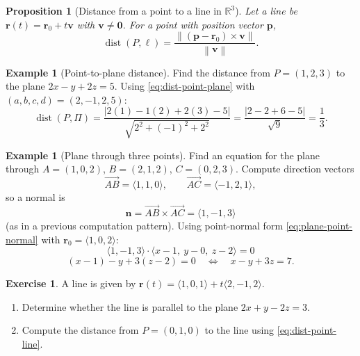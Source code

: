 \documentclass[12pt]{article}
\numberwithin{equation}{section}
\newcommand{\RR}{\mathbb{R}}
\newcommand{\vect}[1]{\boldsymbol{#1}}   %
\newcommand{\norm}[1]{\left\lVert #1\right\rVert}
\theoremstyle{plain}
\newtheorem{proposition}[theorem]{Proposition}
\theoremstyle{definition}
\newtheorem{example}[theorem]{Example}
\newtheorem{exercise}[theorem]{Exercise}
\theoremstyle{remark}
\begin{document}
\begin{proposition}[Distance from a point to a line in $\RR^3$]\label{prop:dist-point-line}
Let a line be $\vect{r}(t)=\vect{r}_0+t\vect{v}$ with $\vect{v}\neq \vect{0}$. For a point with position vector $\vect{p}$,
\begin{equation}\label{eq:dist-point-line}
\operatorname{dist}(P,\ell)=\frac{\norm{(\vect{p}-\vect{r}_0)\times\vect{v}}}{\norm{\vect{v}}}.
\end{equation}
\end{proposition}

\begin{example}[Point-to-plane distance]
Find the distance from $P=(1,2,3)$ to the plane $2x-y+2z=5$.
Using \cref{eq:dist-point-plane} with $(a,b,c,d)=(2,-1,2,5)$:
\[
\operatorname{dist}(P,\Pi)=\frac{|2(1)-1(2)+2(3)-5|}{\sqrt{2^2+(-1)^2+2^2}}
=\frac{|2-2+6-5|}{\sqrt{9}}
=\frac{1}{3}.
\]
\end{example}

\begin{example}[Plane through three points]
Find an equation for the plane through $A=(1,0,2)$, $B=(2,1,2)$, $C=(0,2,3)$.
Compute direction vectors
\[
\overrightarrow{AB}=\langle 1,1,0\rangle,\qquad
\overrightarrow{AC}=\langle -1,2,1\rangle,
\]
so a normal is
\[
\vect{n}=\overrightarrow{AB}\times\overrightarrow{AC}=\langle 1,-1,3\rangle
\]
(as in a previous computation pattern). Using point-normal form \cref{eq:plane-point-normal} with $\vect{r}_0=\langle 1,0,2\rangle$:
\[
\langle 1,-1,3\rangle\cdot\langle x-1,\ y-0,\ z-2\rangle=0
\]
\[
(x-1)-y+3(z-2)=0
\quad\Longleftrightarrow\quad
x-y+3z=7.
\]
\end{example}

\begin{exercise}
A line is given by $\vect{r}(t)=\langle 1,0,1\rangle+t\langle 2,-1,2\rangle$.
\begin{enumerate}[label=(\alph*)]
\item Determine whether the line is parallel to the plane $2x+y-2z=3$.
\item Compute the distance from $P=(0,1,0)$ to the line using \cref{eq:dist-point-line}.
\end{enumerate}
\end{exercise}
\end{document}

